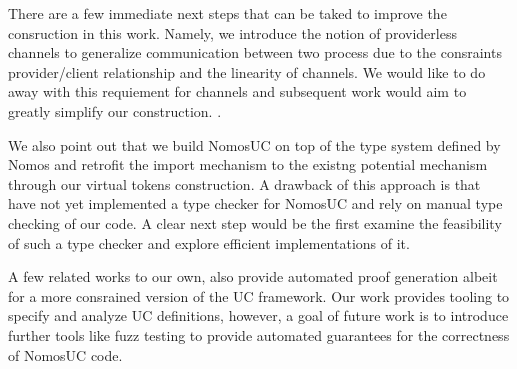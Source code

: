 There are a few immediate next steps that can be taked to improve the consruction in this work.
Namely, we introduce the notion of providerless channels to generalize communication between two process due to the consraints provider/client relationship and the linearity of channels.
We would like to do away with this requiement for channels and subsequent work would aim to greatly simplify our construction. .

We also point out that we build NomosUC on top of the type system defined by Nomos and retrofit the import mechanism to the existng potential mechanism through our virtual tokens construction.
A drawback of this approach is that have not yet implemented a type checker for NomosUC and rely on manual type checking of our code. A clear next step would be the first examine the feasibility of such a type checker and explore efficient implementations of it.

A few related works to our own, also provide automated proof generation albeit for a more consrained version of the UC framework. Our work provides tooling to specify and analyze UC definitions, however, a goal of future work is to introduce further tools like fuzz testing to provide automated guarantees for the correctness of NomosUC code. 

